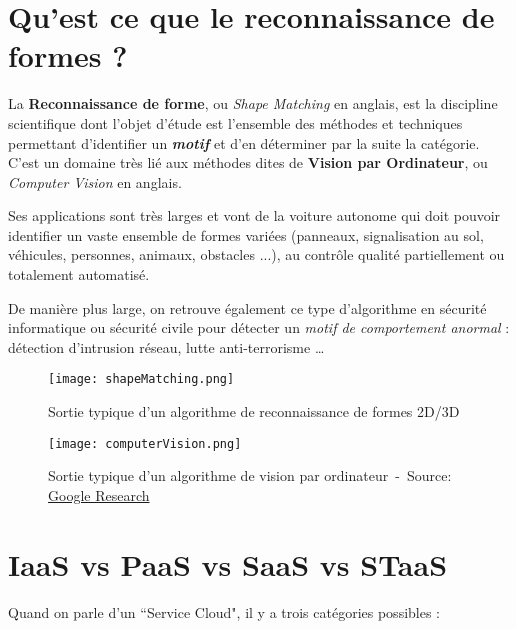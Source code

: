 \section{Qu'est ce que le reconnaissance de formes ?}

La \textbf{Reconnaissance de forme}, ou \textit{Shape Matching} en anglais, est la discipline scientifique dont l'objet d'étude est l'ensemble des méthodes et techniques permettant d'identifier un \textbf{\textit{motif}} et d'en déterminer par la suite la catégorie. C'est un domaine très lié aux méthodes dites de \textbf{Vision par Ordinateur}, ou \textit{Computer Vision} en anglais.

Ses applications sont très larges et vont de la voiture autonome qui doit pouvoir identifier un vaste ensemble de formes variées (panneaux, signalisation au sol, véhicules, personnes, animaux, obstacles ...), au contrôle qualité partiellement ou totalement automatisé.

De manière plus large, on retrouve également ce type d'algorithme en sécurité informatique ou sécurité civile pour détecter un \textit{motif de comportement anormal} : détection d'intrusion réseau, lutte anti-terrorisme \ldots

 \begin{figure}[H]
    \centering
    \texttt{[image: shapeMatching.png]}
	\caption{Sortie typique d'un algorithme de reconnaissance de formes 2D/3D~\cite{shapeMatchingImg}}\label{image.shapeMatching} 
\end{figure}

 \begin{figure}[H]
    \centering
    \texttt{[image: computerVision.png]}
	\caption{Sortie typique d'un algorithme de vision par ordinateur~-~Source: \href{http://googleresearch.blogspot.fr/2014/09/building-deeper-understanding-of-images.html}{Google Research}}\label{image.computerVision} 
\end{figure}

\section{IaaS vs PaaS vs SaaS vs STaaS}

Quand on parle d'un ``Service Cloud", il y a trois catégories possibles :

